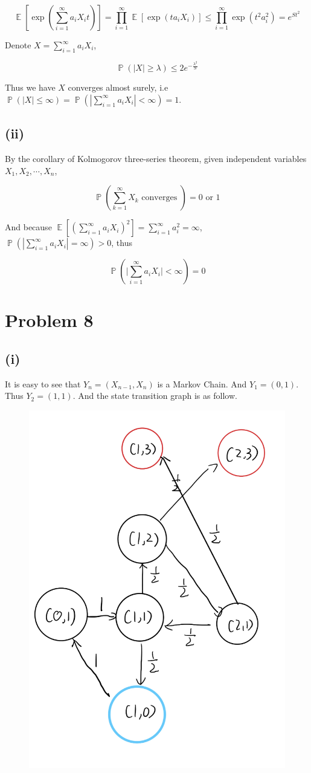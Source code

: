 \documentclass{article}
\DeclareMathOperator{\E}{\mathbb{E}}
\DeclareMathOperator{\bP}{\mathbb{P}}
\begin{document}
\begin{equation}
    \E[\exp(\sum_{i=1}^{\infty} a_iX_it) ] = \prod_{i=1}^{\infty} \E[\exp(ta_iX_i)] \leqslant  \prod_{i=1}^{\infty} \exp(t^2a_i^2)= e^{St^2}
\end{equation}

Denote $X= \sum_{i=1}^{\infty} a_iX_i$, 


\begin{equation}
    \bP(|X| \geqslant \lambda)  \leqslant 2e^{-\frac{\lambda^2}{S}}
\end{equation}

Thus we have $X$ converges almost surely, i.e $\bP(|X| \leqslant \infty) = \bP(|\sum_{i=1}^{\infty} a_iX_i| < \infty) = 1$.

\subsection{(ii)}

By the corollary of Kolmogorov three-series theorem, given independent variables $X_1,X_2,\cdots,X_n$,

\begin{equation}
    \bP\left(\sum_{k=1}^{\infty} X_{k} \text { converges }\right)=0 \text { or } 1
\end{equation}

And because $\E[(\sum_{i=1}^{\infty} a_iX_i)^2] = \sum_{i=1}^{\infty} a_i^2 = \infty$, $\bP(|\sum_{i=1}^{\infty} a_iX_i| = \infty) >0$, thus 

\begin{equation}
    \bP\left(\big|\sum_{i=1}^{\infty} a_iX_i \big| < \infty\right) = 0
\end{equation}


\section{Problem 8}

\subsection{(i)}

It is easy to see that $Y_n = (X_{n-1},X_n)$ is a Markov Chain. And $Y_1 = (0,1)$. Thus $Y_2 = (1,1)$. And the state transition graph is as follow.

\begin{figure}[!htbp]
    \centering
    \includegraphics[width=0.4\linewidth]{State.jpg}
\end{figure}
\end{document}

